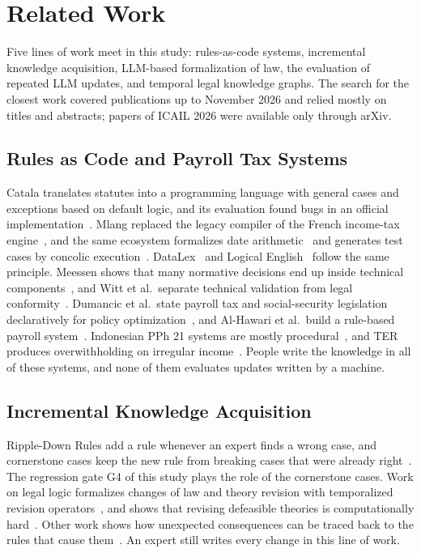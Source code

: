 \section{Related Work}
\label{sec:related}
Five lines of work meet in this study: rules-as-code systems, incremental knowledge acquisition, LLM-based formalization of law, the evaluation of repeated LLM updates, and temporal legal knowledge graphs. The search for the closest work covered publications up to November 2026 and relied mostly on titles and abstracts; papers of ICAIL 2026 were available only through arXiv.

\subsection{Rules as Code and Payroll Tax Systems}
Catala translates statutes into a programming language with general cases and exceptions based on default logic, and its evaluation found bugs in an official implementation~\cite{merigoux2021catala,huttner2022catala}. Mlang replaced the legacy compiler of the French income-tax engine~\cite{merigoux2021mlang}, and the same ecosystem formalizes date arithmetic~\cite{monat2024date} and generates test cases by concolic execution~\cite{goutagny2025cutecat}. DataLex~\cite{mowbray2023scaling,mowbray2023xai} and Logical English~\cite{kowalski2022logicalenglish} follow the same principle. Meessen shows that many normative decisions end up inside technical components~\cite{meessen2023arrows}, and Witt et al.\ separate technical validation from legal conformity~\cite{witt2024encoding}. Dumancic et al.\ state payroll tax and social-security legislation declaratively for policy optimization~\cite{dumancic2021payroll}, and Al-Hawari et al.\ build a rule-based payroll system~\cite{alhawari2026payroll}. Indonesian PPh 21 systems are mostly procedural~\cite{ramadhani2021grossup,yulistyawati2022payroll,kusuma2026pph21}, and TER produces overwithholding on irregular income~\cite{sherra2025ter}. People write the knowledge in all of these systems, and none of them evaluates updates written by a machine.

\subsection{Incremental Knowledge Acquisition}
Ripple-Down Rules add a rule whenever an expert finds a wrong case, and cornerstone cases keep the new rule from breaking cases that were already right~\cite{compton2021rdr}. The regression gate G4 of this study plays the role of the cornerstone cases. Work on legal logic formalizes changes of law and theory revision with temporalized revision operators~\cite{moguillansky2024temporalised}, and shows that revising defeasible theories is computationally hard~\cite{olivieri2025revising}. Other work shows how unexpected consequences can be traced back to the rules that cause them~\cite{fungwacharakorn2021debugging}. An expert still writes every change in this line of work.

